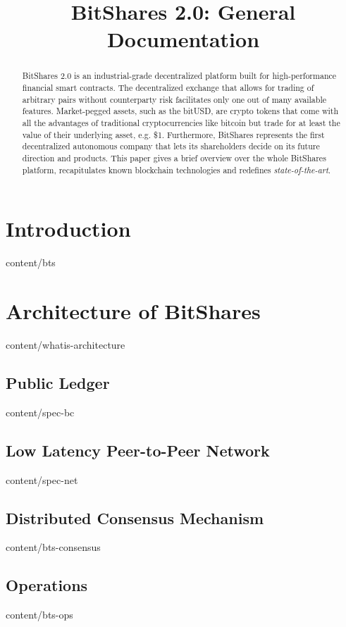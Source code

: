 \documentclass{btswhitepaper}
\title{BitShares 2.0: General Documentation}
\begin{document}
\sloppy
\maketitle

\begin{abstract}%
 BitShares 2.0 is an industrial-grade decentralized platform built for
 high-performance financial smart contracts. The decentralized exchange that
 allows for trading of arbitrary pairs without counterparty risk facilitates
 only one out of many available features. Market-pegged assets, such as the
 bitUSD, are crypto tokens that come with all the advantages of traditional
 cryptocurrencies like bitcoin but trade for at least the value of their
 underlying asset, e.g. \$1. Furthermore, BitShares represents the first
 decentralized autonomous company that lets its shareholders decide on its
 future direction and products. This paper gives a brief overview over the
 whole BitShares platform, recapitulates known blockchain technologies and
 redefines \emph{state-of-the-art}.

\end{abstract}

\section       { Introduction                      }  { content/bts                 } 

\section       { Architecture of BitShares         }  { content/whatis-architecture } 
\subsection    { Public Ledger                     }  { content/spec-bc             } 
\subsection    { Low Latency Peer-to-Peer Network  }  { content/spec-net            } 
\subsection    { Distributed Consensus Mechanism   }  { content/bts-consensus       } 
\subsection    { Operations                        }  { content/bts-ops             } 
\end{document}

